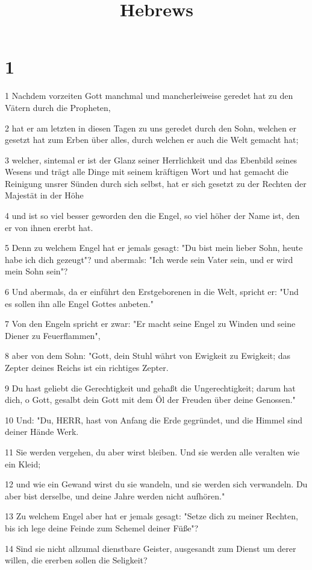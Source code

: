 

\title{Hebrews}


\chapter{1}

\par 1 Nachdem vorzeiten Gott manchmal und mancherleiweise geredet hat zu den Vätern durch die Propheten,
\par 2 hat er am letzten in diesen Tagen zu uns geredet durch den Sohn, welchen er gesetzt hat zum Erben über alles, durch welchen er auch die Welt gemacht hat;
\par 3 welcher, sintemal er ist der Glanz seiner Herrlichkeit und das Ebenbild seines Wesens und trägt alle Dinge mit seinem kräftigen Wort und hat gemacht die Reinigung unsrer Sünden durch sich selbst, hat er sich gesetzt zu der Rechten der Majestät in der Höhe
\par 4 und ist so viel besser geworden den die Engel, so viel höher der Name ist, den er von ihnen ererbt hat.
\par 5 Denn zu welchem Engel hat er jemals gesagt: "Du bist mein lieber Sohn, heute habe ich dich gezeugt"? und abermals: "Ich werde sein Vater sein, und er wird mein Sohn sein"?
\par 6 Und abermals, da er einführt den Erstgeborenen in die Welt, spricht er: "Und es sollen ihn alle Engel Gottes anbeten."
\par 7 Von den Engeln spricht er zwar: "Er macht seine Engel zu Winden und seine Diener zu Feuerflammen",
\par 8 aber von dem Sohn: "Gott, dein Stuhl währt von Ewigkeit zu Ewigkeit; das Zepter deines Reichs ist ein richtiges Zepter.
\par 9 Du hast geliebt die Gerechtigkeit und gehaßt die Ungerechtigkeit; darum hat dich, o Gott, gesalbt dein Gott mit dem Öl der Freuden über deine Genossen."
\par 10 Und: "Du, HERR, hast von Anfang die Erde gegründet, und die Himmel sind deiner Hände Werk.
\par 11 Sie werden vergehen, du aber wirst bleiben. Und sie werden alle veralten wie ein Kleid;
\par 12 und wie ein Gewand wirst du sie wandeln, und sie werden sich verwandeln. Du aber bist derselbe, und deine Jahre werden nicht aufhören."
\par 13 Zu welchem Engel aber hat er jemals gesagt: "Setze dich zu meiner Rechten, bis ich lege deine Feinde zum Schemel deiner Füße"?
\par 14 Sind sie nicht allzumal dienstbare Geister, ausgesandt zum Dienst um derer willen, die ererben sollen die Seligkeit?

